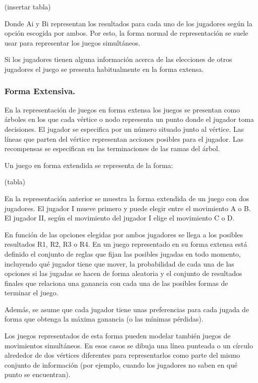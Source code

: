 \documentclass[a4paper]{report} %
\begin{document}
(insertar tabla)

Donde Ai y Bi representan los resultados para cada uno de los jugadores según la opción escogida por ambos. Por esto, la forma normal de representación se suele usar para representar los juegos simultáneos.

Si los jugadores tienen alguna información acerca de las elecciones de otros jugadores el juego se presenta habitualmente en la forma extensa. 

\subsubsection{Forma Extensiva.}

En la representación de juegos en forma extensa los juegos se presentan como árboles en los que cada vértice o nodo representa un punto donde el jugador toma decisiones. El jugador se especifica por un número situado junto al vértice. Las líneas que parten del vértice representan acciones posibles para el jugador. Las recompensas se especifican en las terminaciones de las ramas del árbol. 

Un juego en forma extendida se representa de la forma: 

(tabla)


En la representación anterior se muestra la forma extendida de un juego con dos jugadores. El jugador I mueve primero y puede elegir entre el movimiento A o B. El jugador II, según el movimiento del jugador I elige el movimiento C o D.

En función de las opciones elegidas por ambos jugadores se llega a los posibles resultados R1, R2, R3 o R4. En un juego representado en su forma extensa está definido el conjunto de reglas que fijan las posibles jugadas en todo momento, incluyendo qué jugador tiene que mover, la probabilidad de cada una de las opciones si las jugadas se hacen de forma aleatoria y el conjunto de resultados finales que relaciona una ganancia con cada una de las posibles formas de terminar el juego.

Además, se asume que cada jugador tiene unas preferencias para cada jugada de forma que obtenga la máxima ganancia (o las mínimas pérdidas). 

Los juegos representados de esta forma pueden modelar también juegos de movimientos simultáneos. En esos casos se dibuja una línea punteada o un círculo alrededor de dos vértices diferentes para representarlos como parte del mismo conjunto de información (por ejemplo, cuando los jugadores no saben en qué punto se encuentran). 
\end{document}
